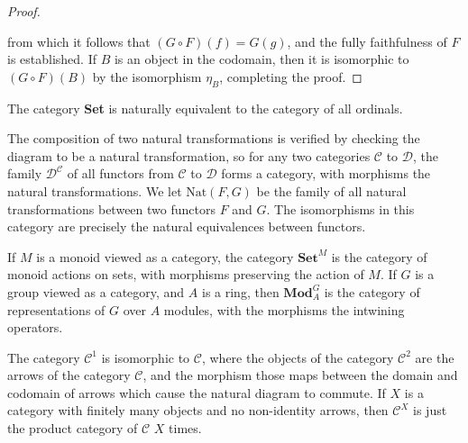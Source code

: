 \begin{proof}
    \begin{center}
    \end{center}
    from which it follows that $(G \circ F)(f) = G(g)$, and the fully faithfulness of $F$ is established. If $B$ is an object in the codomain, then it is isomorphic to $(G \circ F)(B)$ by the isomorphism $\eta_B$, completing the proof.
\end{proof}

\begin{example}
    The category {\bf Set} is naturally equivalent to the category of all ordinals.
\end{example}

The composition of two natural transformations is verified by checking the diagram to be a natural transformation, so for any two categories $\mathcal{C}$ to $\mathcal{D}$, the family $\mathcal{D}^{\mathcal{C}}$ of all functors from $\mathcal{C}$ to $\mathcal{D}$ forms a category, with morphisms the natural transformations. We let $\text{Nat}(F,G)$ be the family of all natural transformations between two functors $F$ and $G$. The isomorphisms in this category are precisely the natural equivalences between functors.

\begin{example}
    If $M$ is a monoid viewed as a category, the category $\textbf{Set}^M$ is the category of monoid actions on sets, with morphisms preserving the action of $M$. If $G$ is a group viewed as a category, and $A$ is a ring, then $\textbf{Mod}_A^G$ is the category of representations of $G$ over $A$ modules, with the morphisms the intwining operators.
\end{example}

\begin{example}
    The category $\mathcal{C}^1$ is isomorphic to $\mathcal{C}$, where the objects of the category $\mathcal{C}^2$ are the arrows of the category $\mathcal{C}$, and the morphism those maps between the domain and codomain of arrows which cause the natural diagram to commute. If $X$ is a category with finitely many objects and no non-identity arrows, then $\mathcal{C}^X$ is just the product category of $\mathcal{C}$ $X$ times.
\end{example}

